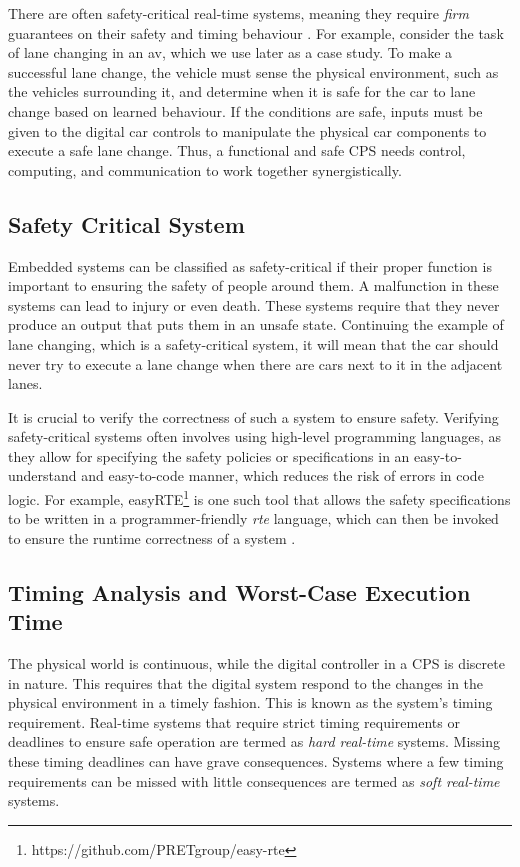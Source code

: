 There are often safety-critical real-time systems, meaning they require \emph{firm} guarantees on their safety and timing behaviour \cite{tripakis_compositionality_2016}. For example, consider the task of lane changing in an  \gls{av}, which we use later as a case study. To make a successful lane change, the vehicle must sense the physical environment, such as the vehicles surrounding it, and determine when it is safe for the car to lane change based on learned behaviour. If the conditions are safe, inputs must be given to the digital car controls to manipulate the physical car components to execute a safe lane change. Thus, a functional and safe CPS needs control, computing, and communication to work together synergistically.



\subsection{Safety Critical System}
Embedded systems can be classified as safety-critical \cite{Doyen2018-st, 7104300} if their proper function is important to ensuring the safety of people around them.
A malfunction in these systems can lead to injury or even death. These systems require that they never produce an output that puts them in an unsafe state. Continuing the example of lane changing, which is a safety-critical system, it will mean that the car should never try to execute a lane change when there are cars next to it in the adjacent lanes.

It is crucial to verify the correctness of such a system to ensure safety. Verifying safety-critical systems often involves using high-level programming languages, as they allow for specifying the safety policies or specifications in an easy-to-understand and easy-to-code manner, which reduces the risk of errors in code logic. For example, easyRTE\footnote{https://github.com/PRETgroup/easy-rte} is one such tool that allows the safety specifications to be written in a programmer-friendly \emph{rte} language, which can then be invoked to ensure the runtime correctness of a system \cite{pearce_smart_2020}. 


\subsection{Timing Analysis and Worst-Case Execution Time}
The physical world is continuous, while the digital controller in a CPS is discrete in nature. This requires that the digital system respond to the changes in the physical environment in a timely fashion. This is known as the system's timing requirement. Real-time systems that require strict timing requirements or deadlines to ensure safe operation are termed as \emph{hard real-time} systems. Missing these timing deadlines can have grave consequences. Systems where a few timing requirements can be missed with little consequences are termed as \emph{soft real-time} \cite{wilhelm_worst-case_2008} systems.  

